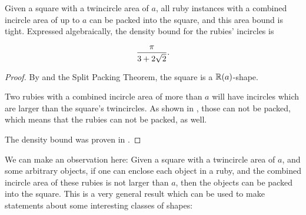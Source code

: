 \documentclass[a4paper,style=print,oneside,bibliography=totoc,nexus,lnum,extramargin]{tubsbook}
\begin{document}
%
%

\begin{theorem}\label{th:square}
    Given a square with a twincircle area of $a$, all ruby instances with a combined incircle area of up to $a$ can be packed into the square, and this area bound is tight. Expressed algebraically, the density bound for the rubies' incircles is

    $$\frac{\pi}{3+2\sqrt{2}}.$$
\end{theorem}

\begin{proof}
    By  and the Split Packing Theorem, the square is a $\mathbb{R}(a)$-shape.

    Two rubies with a combined incircle area of more than $a$ will have incircles which are larger than the square's twincircles. As shown in , those can not be packed, which means that the rubies can not be packed, as well.

    The density bound was proven in .
\end{proof}

We can make an observation here: Given a square with a twincircle area of $a$, and some arbitrary objects, if one can enclose each object in a ruby, and the combined incircle area of these rubies is not larger than $a$, then the objects can be packed into the square. This is a very general result which can be used to make statements about some interesting classes of shapes:
\end{document}
